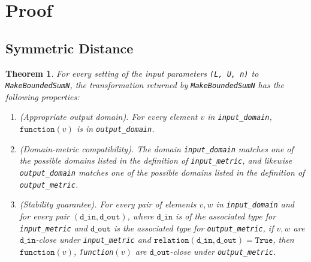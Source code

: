 \documentclass[11pt,a4paper]{article}
\newtheorem{theorem}{Theorem}
\theoremstyle{definition}
\newcommand{\din}{\texttt{d\_in}}
\newcommand{\dout}{\texttt{d\_out}}
\newcommand{\True}{\texttt{True}}
\newcommand{\function}{\texttt{function}}
\begin{document}
\newpage

\section{Proof}
\subsection{Symmetric Distance}
\begin{theorem}
    For every setting of the input parameters \texttt{(L, U, n)} to \texttt{MakeBoundedSumN}, the transformation returned by \texttt{MakeBoundedSumN} has the following properties:
    \begin{enumerate}
        \item \textup{(Appropriate output domain).} For every element $v$ in \texttt{input\_domain}, $\function(v)$ is in \texttt{output\_domain}.
        
        \item \textup{(Domain-metric compatibility).} The domain \texttt{input\_domain} matches one of the possible domains listed in the definition of \texttt{input\_metric}, and likewise \texttt{output\_domain} matches one of the possible domains listed in the definition of \texttt{output\_metric}.
        
        \item \textup{(Stability guarantee).} For every pair of elements $v, w$ in \texttt{input\_domain} and for every pair $(\din, \dout)$,  where $\din$ is of the associated type for \texttt{input\_metric} and $\dout$ is the associated type for \texttt{output\_metric}, if $v,w$ are $\din$-close under \texttt{input\_metric} and $\texttt{relation}(\din, \dout) = \True$, then $\function(v)$, \texttt{function}$(v)$ are $\dout$-close under \texttt{output\_metric}.
    \end{enumerate}
\end{theorem}
\end{document}
